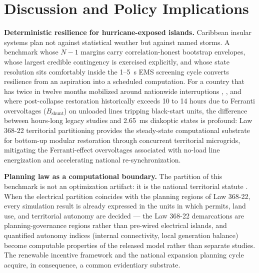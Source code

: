 \section{Discussion and Policy Implications}
\label{sec:discussion}

\textbf{Deterministic resilience for hurricane-exposed islands.} Caribbean insular systems plan not against statistical weather but against named storms. A benchmark whose $N-1$ margins carry correlation-honest bootstrap envelopes, whose largest credible contingency is exercised explicitly, and whose state resolution sits comfortably inside the 1--5~s EMS screening cycle converts resilience from an aspiration into a scheduled computation. For a country that has twice in twelve months mobilized around nationwide interruptions \cite{ocseni}, \cite{diarioLibreHainamosa_2026}, and where post-collapse restoration historically exceeds 10 to 14 hours due to Ferranti overvoltages ($B_{\mathrm{shunt}}$) on unloaded lines tripping black-start units, the difference between hours-long legacy studies and 2.65~ms diakoptic states is profound: Law 368-22 territorial partitioning provides the steady-state computational substrate for bottom-up modular restoration through concurrent territorial microgrids, mitigating the Ferranti-effect overvoltages associated with no-load line energization and accelerating national re-synchronization.

\textbf{Planning law as a computational boundary.} The partition of this benchmark is not an optimization artifact: it is the national territorial statute \cite{ley368}. When the electrical partition coincides with the planning regions of Law 368-22, every simulation result is already expressed in the units in which permits, land use, and territorial autonomy are decided --- the Law 368-22 demarcations are planning-governance regions rather than pre-wired electrical islands, and quantified autonomy indices (internal connectivity, local generation balance) become computable properties of the released model rather than separate studies. The renewable incentive framework \cite{ley57} and the national expansion planning cycle \cite{cne2022} acquire, in consequence, a common evidentiary substrate.

